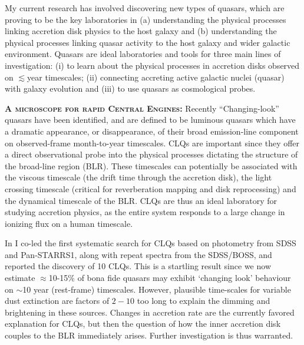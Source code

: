 \smallskip
\smallskip
\noindent
My current research has involved discovering new types of quasars,
which are proving to be the key laboratories in (a) understanding the
physical processes linking accretion disk physics to the host galaxy
and (b) understanding the physical processes linking quasar activity
to the host galaxy and wider galactic environment.  
Quasars are ideal
laboratories and tools for three main lines of investigation: {\rm
(i)} to learn about the physical processes in accretion disks observed
on $\lesssim$year timescales; {\rm (ii)} connecting accreting active
galactic nuclei (quasar) with galaxy evolution and {\rm (iii)} to use
quasars as cosmological probes.

\smallskip
\smallskip
\noindent
\textbf{\textsc{A microscope for rapid Central Engines:}}
Recently ``Changing-look'' quasars 
\citep[CLQs; ][]{LaMassa2015, Runnoe2016, Ruan2016, Runco2016, MacLeod2016, Yang2017} have been
identified, and are defined to be luminous quasars which have a dramatic
appearance, or disappearance, of their broad emission-line component
on observed-frame month-to-year timescales.  CLQs are important since
they offer a direct observational probe into the physical processes
dictating the structure of the broad-line region (BLR). These
timescales can potentially be associated with the viscous timescale
(the drift time through the accretion disk), the light crossing
timescale (critical for reverberation mapping and disk reprocessing)
and the dynamical timescale of the BLR.  CLQs are thus an ideal
laboratory for studying accretion physics, as the entire system
responds to a large change in ionizing flux on a human timescale.

\smallskip \smallskip
\noindent 
In \citet{MacLeod2016}I co-led the first systematic search for CLQs based on
photometry from SDSS and Pan-STARRS1, along with repeat spectra from
the SDSS/BOSS, and reported the discovery of 10 CLQs. This is a
startling result since we now estimate $\approx$10-15\% of bona fide
quasars may exhibit `changing look' behaviour on $\sim$10 year 
(rest-frame) timescales. However, plausible time-scales for variable
dust extinction are factors of $2-10$ too long to explain the dimming
and brightening in these sources.  Changes in accretion rate are the
currently favored explanation for CLQs, but then the question of how
the inner accretion disk couples to the BLR immediately
arises. Further investigation is thus warranted.


